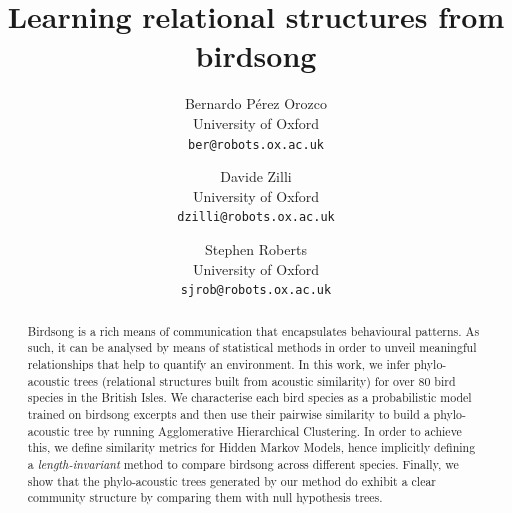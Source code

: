 \documentclass[pdftex,11pt,a4paper]{article}
\theoremstyle{definition}
\theoremstyle{remark}
\begin{document}
\title{Learning relational structures from birdsong}
\author{Bernardo P\'erez Orozco\\University of Oxford\\\texttt{ber@robots.ox.ac.uk} \and Davide Zilli \\University of Oxford\\\texttt{dzilli@robots.ox.ac.uk} \and Stephen Roberts\\University of Oxford\\\texttt{sjrob@robots.ox.ac.uk}}

\maketitle


\begin{abstract}
Birdsong is a rich means of communication that encapsulates behavioural patterns. As such, it can be analysed by means of statistical methods in order to unveil meaningful relationships that help to quantify an environment. In this work, we infer phylo-acoustic trees (relational structures built from acoustic similarity) for over 80 bird species in the British Isles. We characterise each bird species as a probabilistic model trained on birdsong excerpts and then use their pairwise similarity to build a phylo-acoustic tree by running Agglomerative Hierarchical Clustering. In order to achieve this, we define similarity metrics for Hidden Markov Models, hence implicitly defining a \emph{length-invariant} method to compare birdsong across different species. Finally, we show that the phylo-acoustic trees generated by our method do exhibit a clear community structure by comparing them with null hypothesis trees.
\end{abstract}
\end{document}
